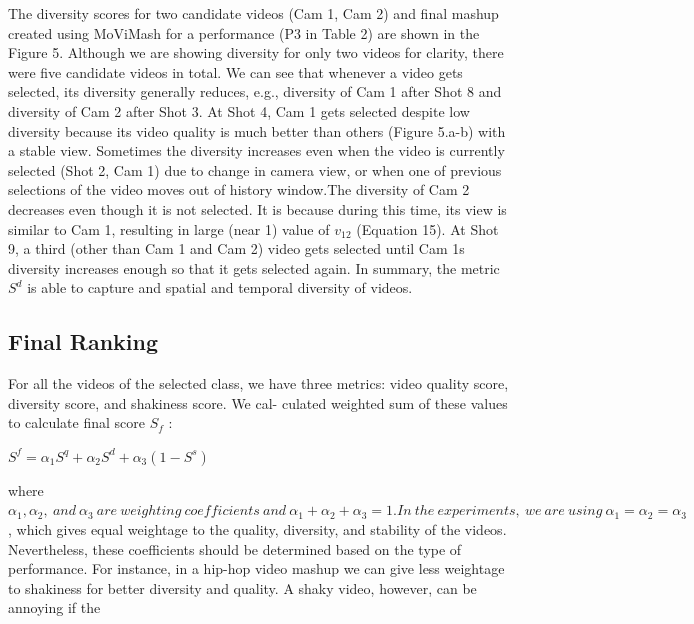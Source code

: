 \documentclass{sig-alternate-05-2015}
\begin{document}
The diversity scores for two candidate videos (Cam 1, Cam 2)
and final mashup created using MoViMash for a performance (P3
in Table 2) are shown in the Figure 5. Although we are showing
diversity for only two videos for clarity, there were five candidate
videos in total. We can see that whenever a video gets selected,
its diversity generally reduces, e.g., diversity of Cam 1 after Shot 8
and diversity of Cam 2 after Shot 3. At Shot 4, Cam 1 gets selected
despite low diversity because its video quality is much better than
others (Figure 5.a-b) with a stable view. Sometimes the diversity
increases even when the video is currently selected (Shot 2, Cam 1)
due to change in camera view, or when one of previous selections
of the video moves out of history window.The diversity of Cam 2
decreases even though it is not selected. It is because during this
time, its view is similar to Cam 1, resulting in large (near 1) value
of $v_12$ (Equation 15). At Shot 9, a third (other than Cam 1 and Cam
2) video gets selected until Cam 1s diversity increases enough so
that it gets selected again. In summary, the metric $S^d$ is able to
capture and spatial and temporal diversity of videos.

\subsection{Final Ranking}
For all the videos of the selected class, we have three metrics:
video quality score, diversity score, and shakiness score. We cal-
culated weighted sum of these values to calculate final score $S_f$ :
\begin{center}
$S^f = \alpha_1S^q + \alpha_2S^d + \alpha_3(1 − S^s )$
\end{center}
where $\alpha_1 , \alpha_2 ,\ and\ \alpha_3\ are\ weighting\ coefficients\ and\ \alpha_1 + \alpha_2 +
\alpha_3 = 1. In\ the\ experiments,\ we\ are\ using\ \alpha_1 = \alpha_2 = \alpha_3 $, which gives equal weightage to the quality, diversity, and stability of the videos. Nevertheless, these coefficients should be determined based on the type of performance. For instance, in a hip-hop
video mashup we can give less weightage to shakiness for better diversity and quality. A shaky video, however, can be annoying if the
\end{document}
